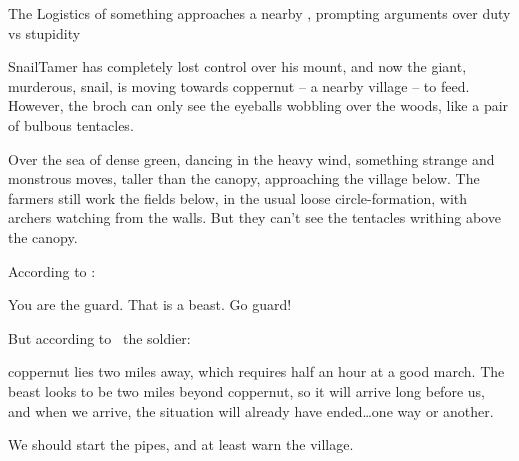 \renewcommand\csComments{
  \draw[very thick,gray] (12,0.6) -- (13,0.6) node[anchor=north]{\outline{1 Mile}} -- (17,0.6) node[anchor=north]{\outline{5 Miles}} ;
}




{The Logistics of }%
{something approaches a nearby , prompting arguments over duty vs stupidity}%

\Gls{SnailTamer} has completely lost control over his mount, and now the giant, murderous, snail, is moving towards \gls{coppernut} -- a nearby \gls{village} -- to feed.
However, the \gls{broch} can only see the eyeballs wobbling over the woods, like a pair of bulbous tentacles.

\begin{boxtext}
  Over the sea of dense green, dancing in the heavy wind, something strange and monstrous moves, taller than the canopy, approaching the \gls{village} below.
  The farmers still work the fields below, in the usual loose circle-formation, with archers watching from the walls.
  But they can't see the tentacles writhing above the canopy.
\end{boxtext}

According to :

\begin{speechtext}
  You are the \gls{guard}.
  That is a beast.
  Go guard!
\end{speechtext}

But according to \composeHumanName\ the \gls{soldier}:

\begin{speechtext}
  \Gls{coppernut} lies two miles away, which requires half an hour at a good march.
  The beast looks to be two miles beyond \gls{coppernut}, so it will arrive long before us, and when we arrive, the situation will already have ended\ldots one way or another.

  We should start the pipes, and at least warn the \gls{village}.
\end{speechtext}

